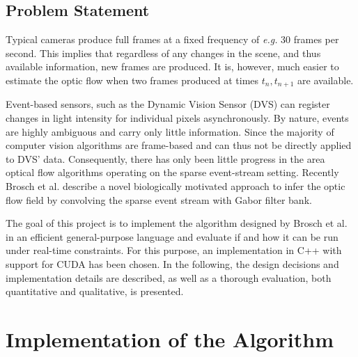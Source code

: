 \documentclass[a4paper,twoside, openright,12pt]{report}
\begin{document}
\section{Problem Statement}

Typical cameras produce full frames at a fixed frequency of \emph{e.g.} 30 frames per second.
This implies that regardless of any changes in the scene, and thus available information, new frames are produced.
It is, however, much easier to estimate the optic flow when two frames produced at times $t_n,t_{n+1}$ are available.

Event-based sensors, such as the Dynamic Vision Sensor (DVS) \cite{Delbruck} can register changes in light intensity for individual pixels asynchronously. By nature, events are highly ambiguous and carry only little information. Since the majority of computer vision algorithms are frame-based and can thus not be directly applied to DVS' data. Consequently, there has only been little progress in the area optical flow algorithms operating on the sparse event-stream setting.
Recently Brosch et al. \cite{Brosch2015} describe a novel biologically motivated approach to infer the optic flow field by convolving the sparse event stream with Gabor filter bank.

The goal of this project is to implement the algorithm designed by Brosch et al. in an efficient general-purpose language and evaluate if and how it can be run under real-time constraints.
For this purpose, an implementation in C++ with support for CUDA has been chosen.
In the following, the design decisions and implementation details are described, as well as a thorough evaluation, both quantitative and qualitative, is presented.






\newpage
\chapter{Implementation of the Algorithm}
\end{document}
